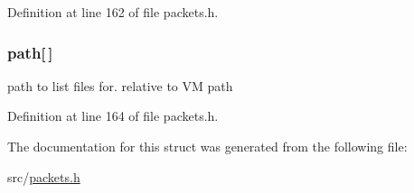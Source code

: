 Definition at line 162 of file packets.\+h.

\hypertarget{struct_l_i_s_t___f_i_l_e_s_a5b52bf017932056c1f97b175be6bd8b1}{}
\subsubsection[{path}]{ path\mbox{[}$\,$\mbox{]}}\label{struct_l_i_s_t___f_i_l_e_s_a5b52bf017932056c1f97b175be6bd8b1}
path to list files for. relative to V\+M path 

Definition at line 164 of file packets.\+h.



The documentation for this struct was generated from the following file\+:\begin{DoxyCompactItemize}
\item 
src/\hyperlink{packets_8h}{packets.\+h}\end{DoxyCompactItemize}
